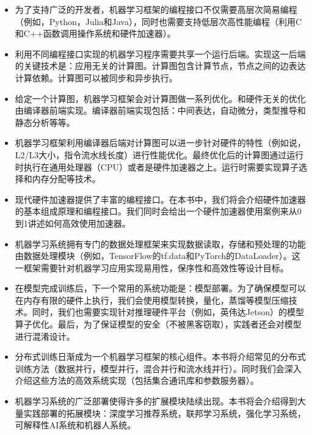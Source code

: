 \documentclass[letterpaper,10pt,english]{sphinxmanual}
\begin{document}
\begin{itemize}
\item {} 
\sphinxAtStartPar
{}
为了支持广泛的开发者，机器学习框架的编程接口不仅需要高层次简易编程（例如，Python，Julia和Java），同时也需要支持低层次高性能编程（利用C和C++函数调用操作系统和硬件加速器）。

\item {} 
\sphinxAtStartPar
{}
利用不同编程接口实现的机器学习程序需要共享一个运行后端。实现这一后端的关键技术是：应用无关的计算图。计算图包含计算节点，节点之间的边表达计算依赖。计算图可以被同步和异步执行。

\item {} 
\sphinxAtStartPar
{}
给定一个计算图，机器学习框架会对计算图做一系列优化。和硬件无关的优化由编译器前端实现。编译器前端实现包括：中间表达，自动微分，类型推导和静态分析等等。

\item {} 
\sphinxAtStartPar
{}
机器学习框架利用编译器后端对计算图可以进一步针对硬件的特性（例如说，L2/L3大小，指令流水线长度）进行性能优化。最终优化后的计算图通过运行时执行在通用处理器（CPU）或者是硬件加速器之上。运行时需要实现算子选择和内存分配等技术。

\item {} 
\sphinxAtStartPar
{}
现代硬件加速器提供了丰富的编程接口。在本书中，我们将会介绍硬件加速器的基本组成原理和编程接口。我们同时会给出一个硬件加速器使用案例来从0到1讲述如何高效使用加速器。

\item {} 
\sphinxAtStartPar
{}
机器学习系统拥有专门的数据处理框架来实现数据读取，存储和预处理的功能由数据处理模块（例如，TensorFlow的tf.data和PyTorch的DataLoader）。这一框架需要针对机器学习应用实现易用性，保序性和高效性等设计目标。

\item {} 
\sphinxAtStartPar
{}
在模型完成训练后，下一个常用的系统功能是：模型部署。为了确保模型可以在内存有限的硬件上执行，我们会使用模型转换，量化，蒸馏等模型压缩技术。同时，我们也需要实现针对推理硬件平台（例如，英伟达Jetson）的模型算子优化。最后，为了保证模型的安全（不被黑客窃取），实践者还会对模型进行混淆设计。

\item {} 
\sphinxAtStartPar
{}
分布式训练日渐成为一个机器学习框架的核心组件。本书将介绍常见的分布式训练方法（数据并行，模型并行，混合并行和流水线并行）。同时我们会深入介绍这些方法的高效系统实现（包括集合通讯库和参数服务器）。

\item {} 
\sphinxAtStartPar
{}
机器学习系统的广泛部署使得许多的扩展模块陆续出现。本书将会介绍得到大量实践部署的拓展模块：深度学习推荐系统，联邦学习系统，强化学习系统，可解释性AI系统和机器人系统。

\end{itemize}
\end{document}
